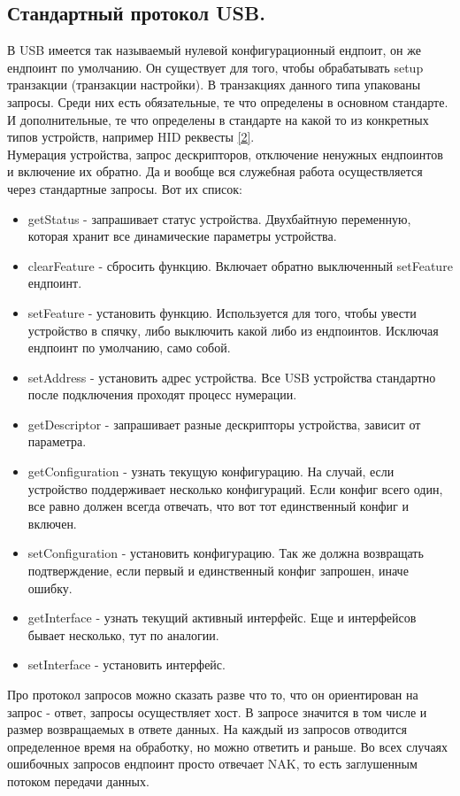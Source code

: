 \documentclass[12pt,a4paper]{article}
\begin{document}
\subsection{Стандартный протокол USB.}
    В USB имеется так называемый нулевой конфигурационный ендпоит, он же
    ендпоинт по умолчанию. Он существует для того, чтобы обрабатывать setup
    транзакции (транзакции настройки). В транзакциях данного типа упакованы
    запросы. Среди них есть обязательные, те что определены в основном
    стандарте. И дополнительные, те что определены в стандарте на какой
    то из конкретных типов устройств, например HID реквесты \ref{2}.\\
    Нумерация устройства, запрос дескрипторов, отключение ненужных ендпоинтов
    и включение их обратно. Да и вообще вся служебная работа осуществляется
    через стандартные запросы. Вот их список:
\begin{itemize}
    \item getStatus - запрашивает статус устройства. Двухбайтную переменную,
    которая хранит все динамические параметры устройства.
    \item clearFeature - сбросить функцию. Включает обратно выключенный
    setFeature ендпоинт.
    \item setFeature - установить функцию. Используется для того, чтобы
    увести устройство в спячку, либо выключить какой либо из ендпоинтов.
    Исключая ендпоинт по умолчанию, само собой.
    \item setAddress - установить адрес устройства. Все USB устройства
    стандартно после подключения проходят процесс нумерации.
    \item getDescriptor - запрашивает разные дескрипторы устройства, зависит от
    параметра.
    \item getConfiguration - узнать текущую конфигурацию. На случай, если
    устройство поддерживает несколько
    конфигураций. Если конфиг всего один, все равно должен всегда отвечать, что
    вот тот единственный конфиг и включен.
    \item setConfiguration - установить конфигурацию. Так же должна возвращать
    подтверждение, если первый и единственный конфиг запрошен, иначе ошибку.
    \item getInterface - узнать текущий активный интерфейс. Еще и интерфейсов
    бывает несколько, тут по аналогии.
    \item setInterface - установить интерфейс.
\end{itemize}
    Про протокол запросов можно сказать разве что то, что он ориентирован на
    запрос - ответ, запросы осуществляет хост. В запросе значится в том числе
    и размер возвращаемых в ответе данных. На каждый из запросов отводится
    определенное время на обработку, но можно ответить и раньше. Во всех случаях
    ошибочных запросов
    ендпоинт просто отвечает NAK, то есть заглушенным потоком передачи данных.
\end{document}
